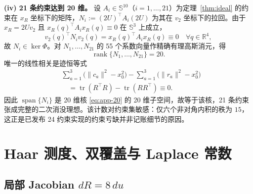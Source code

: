 \textbf{(iv) 21 条约束达到 20 维。} 设 $A_i\in\mathbb{S}^{10}$（$i=1,\dots,21$）为定理~\ref{thm:ideal} 的约束在 $x_R$ 坐标下的矩阵，$N_i:=(2U)^\top A_i(2U)$ 为其在 $v_2$ 坐标下的拉回。由于 $x_R=2Uv_2$ 且 $x_R(q)^\top A_ix_R(q)\equiv0$ 在 $\mathbb{S}^3$ 上成立，
\begin{equation}
v_2(q)^\top N_iv_2(q)=x_R(q)^\top A_ix_R(q)\equiv0\quad\forall q\in\mathbb{R}^4,
\label{eq:app-pullback}
\end{equation}
故 $N_i\in\ker\Phi$。对 $N_1,\dots,N_{21}$ 的 55 个系数向量作精确有理高斯消元，得
\begin{equation}
\operatorname{rank}\{N_1,\dots,N_{21}\}=20 .
\label{eq:app-rank}
\end{equation}
唯一的线性相关是迹恒等式
\begin{equation}
\begin{split}
&\sum_{a=1}^{3}\big(\|c_a\|^2-x_0^2\big)-\sum_{a=1}^{3}\big(\|r_a\|^2-x_0^2\big)\\
&\quad=\operatorname{tr}(R^\top R)-\operatorname{tr}(RR^\top)\equiv0 .
\end{split}
\label{eq:app-dependency}
\end{equation}
因此 $\operatorname{span}\{N_i\}$ 是 20 维核 \eqref{eq:app-20} 的 20 维子空间，故等于该核，21 条约束张成完整的二次消没理想。该计数对约束集敏感：仅六个非对角内积的秩为 $15$，这正是已发布 24 约束实现的约束亏缺并非记账细节的原因。

\section{Haar 测度、双覆盖与 Laplace 常数}\label{app:haar}

\subsection*{局部 Jacobian \texorpdfstring{$dR=8\,du$}{dR=8du}}

